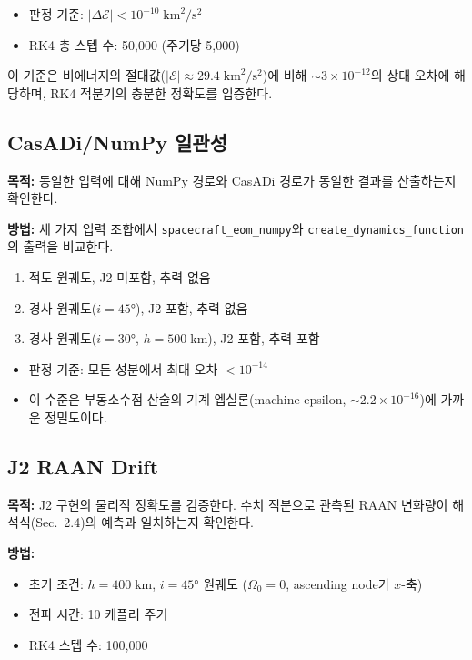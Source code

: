 \documentclass[11pt]{article}
\begin{document}
\begin{itemize}
  \item 판정 기준: $|\Delta\mathcal{E}| < 10^{-10}\;\text{km}^2/\text{s}^2$
  \item RK4 총 스텝 수: 50,000 (주기당 5,000)
\end{itemize}

이 기준은 비에너지의 절대값($|\mathcal{E}| \approx 29.4\;\text{km}^2/\text{s}^2$)에 비해 $\sim 3 \times 10^{-12}$의 상대 오차에 해당하며, RK4 적분기의 충분한 정확도를 입증한다.


\subsection{CasADi/NumPy 일관성}

\textbf{목적:} 동일한 입력에 대해 NumPy 경로와 CasADi 경로가 동일한 결과를 산출하는지 확인한다.

\textbf{방법:} 세 가지 입력 조합에서 \texttt{spacecraft\_eom\_numpy}와 \texttt{create\_dynamics\_function}의 출력을 비교한다.
\begin{enumerate}
  \item 적도 원궤도, J2 미포함, 추력 없음
  \item 경사 원궤도($i = 45°$), J2 포함, 추력 없음
  \item 경사 원궤도($i = 30°$, $h = 500\;\text{km}$), J2 포함, 추력 포함
\end{enumerate}

\begin{itemize}
  \item 판정 기준: 모든 성분에서 최대 오차 $< 10^{-14}$
  \item 이 수준은 부동소수점 산술의 기계 엡실론(machine epsilon, $\sim 2.2 \times 10^{-16}$)에 가까운 정밀도이다.
\end{itemize}

\subsection{J2 RAAN Drift}

\textbf{목적:} J2 구현의 물리적 정확도를 검증한다. 수치 적분으로 관측된 RAAN 변화량이 해석식(Sec.~2.4)의 예측과 일치하는지 확인한다.

\textbf{방법:}
\begin{itemize}
  \item 초기 조건: $h = 400\;\text{km}$, $i = 45°$ 원궤도 ($\Omega_0 = 0$, ascending node가 $x$-축)
  \item 전파 시간: 10 케플러 주기
  \item RK4 스텝 수: 100,000
\end{itemize}
\end{document}

